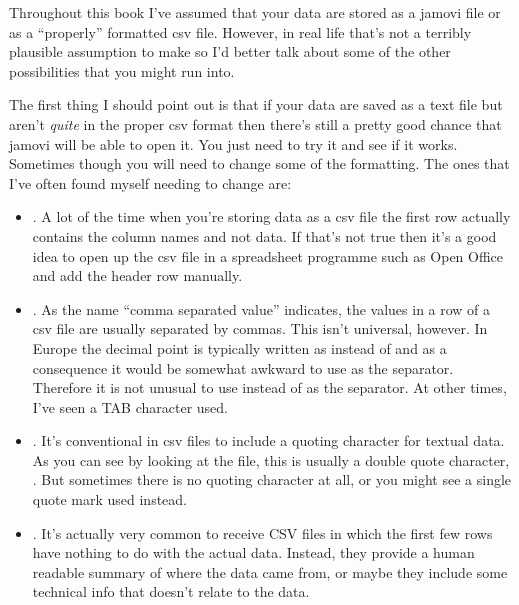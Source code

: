 Throughout this book I've assumed that your data are stored as a jamovi  file or as a ``properly'' formatted csv file. However, in real life that's not a terribly plausible assumption to make so I'd better talk about some of the other possibilities that you might run into. 



The first thing I should point out is that if your data are saved as a text file but aren't {\it quite} in the proper csv format then there's still a pretty good chance that jamovi will be able to open it. You just need to try it and see if it works. Sometimes though you will need to change some of the formatting. The ones that I've often found myself needing to change are:
\begin{itemize}
\item {}. A lot of the time when you're storing data as a csv file the first row actually contains the column names and not data. If that's not true then it's a good idea to open up the csv file in a spreadsheet programme such as Open Office and add the header row manually. 
\item {}. As the name ``comma separated value'' indicates, the values in a row of a csv file are usually separated by commas. This isn't universal, however. In Europe the decimal point is typically written as \rtext{,} instead of  and as a consequence it would be somewhat awkward to use \rtext{,} as the separator. Therefore it is not unusual to use \rtext{;} instead of \rtext{,} as the separator. At other times, I've seen a TAB character used. 
\item {}. It's conventional in csv files to include a quoting character for textual data. As you can see by looking at the  file, this is usually a double quote character, . But sometimes there is no quoting character at all, or you might see a single quote mark  used instead. 
\item {}. It's actually very common to receive CSV files in which the first few rows have nothing to do with the actual data. Instead, they provide a human readable summary of where the data came from, or maybe they include some technical info that doesn't relate to the data. 

\end{itemize}
